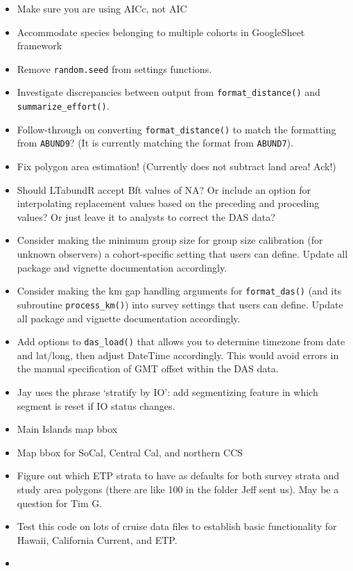 \documentclass[
]{book}
\begin{document}
\begin{itemize}
\item
  Make sure you are using AICc, not AIC
\item
  Accommodate species belonging to multiple cohorts in GoogleSheet framework
\item
  Remove \texttt{random.seed} from settings functions.
\item
  Investigate discrepancies between output from \texttt{format\_distance()} and \texttt{summarize\_effort()}.
\item
  Follow-through on converting \texttt{format\_distance()} to match the formatting from \texttt{ABUND9}? (It is currently matching the format from \texttt{ABUND7}).
\item
  Fix polygon area estimation! (Currently does not subtract land area! Ack!)
\item
  Should LTabundR accept Bft values of NA? Or include an option for interpolating replacement values based on the preceding and proceding values? Or just leave it to analysts to correct the DAS data?
\item
  Consider making the minimum group size for group size calibration (for unknown observers) a cohort-specific setting that users can define. Update all package and vignette documentation accordingly.
\item
  Consider making the km gap handling arguments for \texttt{format\_das()} (and its subroutine \texttt{process\_km()}) into survey settings that users can define. Update all package and vignette documentation accordingly.
\item
  Add options to \texttt{das\_load()} that allows you to determine timezone from date and lat/long, then adjust DateTime accordingly. This would avoid errors in the manual specification of GMT offset within the DAS data.
\item
  Jay uses the phrase `stratify by IO': add segmentizing feature in which segment is reset if IO status changes.
\item
  Main Islands map bbox
\item
  Map bbox for SoCal, Central Cal, and northern CCS
\item
  Figure out which ETP strata to have as defaults for both survey strata and study area polygons (there are like 100 in the folder Jeff sent us). May be a question for Tim G.
\item
  Test this code on lots of cruise data files to establish basic functionality for Hawaii, California Current, and ETP.
\item

\end{itemize}
\end{document}
